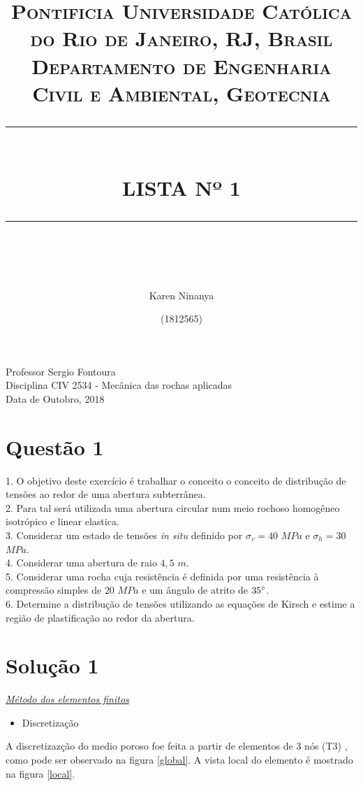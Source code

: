 \documentclass{article} %
\title{
	\normalfont \normalsize 
	\textsc{Pontificia Universidade Católica do Rio de Janeiro, RJ, Brasil \\ 
		Departamento de Engenharia Civil e Ambiental, Geotecnia} \\
	[10pt] 
	\rule{\linewidth}{0.5pt} \\[6pt] 
	\huge LISTA Nº 1\\
	\rule{\linewidth}{2pt}  \\[10pt]
}
\author{Karen Ninanya}
\date{\normalsize (1812565)}
\begin{document}
	
	\maketitle
	\noindent
	Professor \dotfill Sergio Fontoura\\
	Disciplina \dotfill CIV 2534 - Mecânica das rochas aplicadas\\
	Data  de Outobro, 2018 \\
	
	\newpage
	\newpage


\section*{Questão 1}

\vspace{10mm}
1. O objetivo deste exercício é trabalhar o conceito o conceito de distribução de tensões ao redor de uma abertura subterrânea.\\
2. Para tal será utilizada uma abertura circular num meio rochoso homogêneo isotrópico e linear elastica.\\
3. Considerar um estado de tensões \textit{in situ} definido por \(\sigma_v=40\) \(MPa\) e \(\sigma_h=30\) \(MPa\).\\
4. Considerar uma abertura de raio \(4,5\) \(m\).\\
5. Considerar uma rocha cuja resistência é definida por uma resistência à compressão simples de \(20\) \(MPa\) e um ângulo de atrito de \(35\degree\).\\
6. Determine a distribução de tensões utilizando as equações de Kirsch e estime a região de plastificação ao redor da abertura.




\newpage

\section*{Solução 1}

\vspace{10mm}


\underline{\large \textit{Método dos elementos finitos}}\\

\begin{itemize}
	\item Discretização
\end{itemize}

A discretizazção do medio poroso foe feita a partir de elementos de 3 nós (T3) , como pode ser observado na figura \ref{global}. A vista local do elemento é mostrado na figura \ref{local}.
\end{document}
